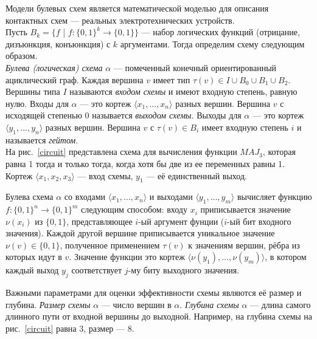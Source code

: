 \documentclass{spbau-diploma}
\begin{document}
Модели булевых схем является математической моделью для описания контактных схем --- реальных электротехнических устройств. \\
Пусть $B_k = \{f$ | $f: {\{0,1\}}^k \to \{0, 1\}\}$ --- набор логических функций (отрицание, дизъюнкция, конъюнкция) с $k$ аргументами.
Тогда определим схему следующим образом. 
\\
\textit{Булева (логическая) схема} $\alpha$ --- помеченный конечный ориентированный ациклический граф. Каждая вершина $v$ имеет тип $\tau(v)  \in I \cup B_0 \cup B_1 \cup B_2$. Вершины типа $I$ называются \textit{входом схемы} и имеют входную степень, равную нулю. Входы для $\alpha$ --- это кортеж $\langle x_1, ..., x_n \rangle$ разных вершин. Вершина $v$ с исходящей степенью 0 называется \textit{выходом схемы}. Выходы для $\alpha$ --- это кортеж $\langle y_1, ..., y_n \rangle$ разных вершин. Вершина $v$ с $\tau(v) \in B_i$ имеет входную степень $i$ и называется \textit{гейтом}. 
\\
На рис.~\ref{circuit} представлена схема для вычисления функции ${MAJ}_3$, которая равна 1 тогда и только тогда, когда хотя бы две из ее переменных равны 1. Кортеж $\langle x_1, x_2, x_3 \rangle$ --- вход схемы, $ y_1$ --- её единственный  выход.

Булева схема $\alpha$ со входами  $\langle x_1, ..., x_n \rangle$ и выходами $\langle y_1, ..., y_m \rangle$ вычисляет функцию $f: {\{0,1\}}^n \to {\{0, 1\}}^m$ следующим способом: входу $x_i$ приписывается значение $\nu(x_i)$ из $\{0, 1\}$, представляющее $i$-ый аргумент фунции ($i$-ый бит входного значения). Каждой другой вершине приписывается уникальное значение $\nu(v) \in \{0, 1\}$,  полученное применением $\tau(v)$ к значениям вершин, рёбра из которых идут в $v$. Значение функции это кортеж $\langle \nu(y_1), ..., \nu(y_m) \rangle$, в котором каждый выход $y_j$ соответствует $j$-му биту выходного значения. 

Важными параметрами для оценки эффективности схемы являются её размер и глубина.
\textit{Размер схемы}  $\alpha$ --- число вершин в $\alpha$. \textit{Глубина схемы} $\alpha$ --- длина самого длинного пути от входной вершины до выходной. 
Например, на глубина схемы на рис.~\ref{circuit} равна 3, размер --- 8.
\end{document}
